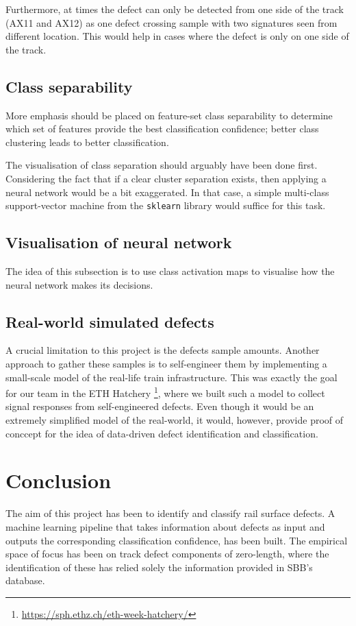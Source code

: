 Furthermore, at times the defect can only be detected from one side of the track (AX11 and AX12) as one defect crossing sample with two signatures seen from different location. This would help in cases where the defect is only on one side of the track.

\subsection{Class separability}
More emphasis should be placed on feature-set class separability to determine which set of features provide the best classification confidence; better class clustering leads to better classification.\todo{}

The visualisation of class separation should arguably have been done first. Considering the fact that if a clear cluster separation exists, then applying a neural network would be a bit exaggerated. In that case, a simple multi-class support-vector machine from the \verb|sklearn| library would suffice for this task.

\subsection{Visualisation of neural network}
The idea of this subsection is to use class activation maps to visualise how the neural network makes its decisions.\todo{}

\subsection{Real-world simulated defects}
A crucial limitation to this project is the defects sample amounts. Another approach to gather these samples is to self-engineer them by implementing a small-scale model of the real-life train infrastructure. This was exactly the goal for our team in the ETH Hatchery \footnote{\url{https://sph.ethz.ch/eth-week-hatchery/}}, where we built such a model to collect signal responses from self-engineered defects. Even though it would be an extremely simplified model of the real-world, it would, however, provide proof of conccept for the idea of data-driven defect identification and classification.

\newpage
\section{Conclusion}
The aim of this project has been to identify and classify rail surface defects. A machine learning pipeline that takes information about defects as input and outputs the corresponding classification confidence, has been built. The empirical space of focus has been on track defect components of zero-length, where the identification of these has relied solely the information provided in SBB's database.

